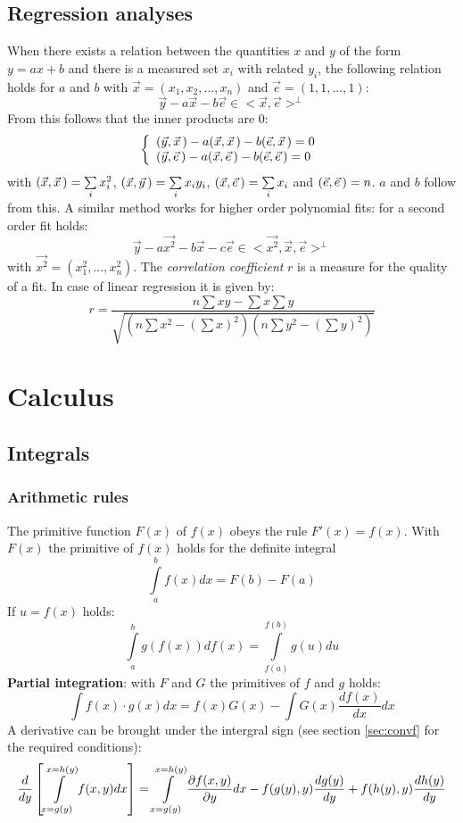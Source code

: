 \documentclass[twoside]{report}
\begin{document}
\section{Regression analyses}
When there exists a relation between the quantities $x$ and $y$ of the form
$y=ax+b$ and there is a measured set $x_i$ with related $y_i$, the following
relation holds for $a$ and $b$ with $\vec{x}=(x_1,x_2,...,x_n)$ and
$\vec{e}=(1,1,...,1)$:
\[
\vec{y}-a\vec{x}-b\vec{e}\in<\vec{x},\vec{e}>^\perp
\]
From this follows that the inner products are 0:
\[
\left\{
\begin{array}{l}
(\vec{y},\vec{x}\,)-a(\vec{x},\vec{x}\,)-b(\vec{e},\vec{x}\,)=0\\
(\vec{y},\vec{e}\,)-a(\vec{x},\vec{e}\,)-b(\vec{e},\vec{e}\,)=0
\end{array}\right.
\]
with $(\vec{x},\vec{x}\,)=\sum\limits_i x_i^2$, $(\vec{x},\vec{y}\,)=\sum\limits_ix_iy_i$,
$(\vec{x},\vec{e}\,)=\sum\limits_ix_i$ and $(\vec{e},\vec{e}\,)=n$.
$a$ and $b$ follow from this.
\npar
A similar method works for higher order polynomial fits: for a second order
fit holds:
\[
\vec{y}-a\vec{x^2}-b\vec{x}-c\vec{e}\in<\vec{x^2},\vec{x},\vec{e}>^\perp
\]
with $\vec{x^2}=(x_1^2,...,x_n^2)$.
\npar
The {\it correlation coefficient} $r$ is a measure for the quality of a fit.
In case of linear regression it is given by:
\[
r=\frac{n\sum xy-\sum x\sum y}{\sqrt{(n\sum x^2-(\sum x)^2)(n\sum y^2-(\sum y)^2)}}
\]


\chapter{Calculus}
\section{Integrals}
\subsection{Arithmetic rules}
The primitive function $F(x)$ of $f(x)$ obeys the rule $F'(x)=f(x)$. With
$F(x)$ the primitive of $f(x)$ holds for the definite integral
\[
\int\limits_a^bf(x)dx=F(b)-F(a)
\]
If $u=f(x)$ holds:
\[
\int\limits_a^bg(f(x))df(x)=\int\limits_{f(a)}^{f(b)}g(u)du
\]
{\bf Partial integration}: with $F$ and $G$ the primitives of $f$ and $g$
holds:
\[
\int f(x)\cdot g(x)dx=f(x)G(x)-\int G(x)\frac{df(x)}{dx}dx
\]
A derivative can be brought under the intergral sign (see section
\ref{sec:convf} for the required conditions):
\[
\frac{d}{dy}\left[\int\limits_{x=g(y)}^{x=h(y)}f(x,y)dx\right]=
\int\limits_{x=g(y)}^{x=h(y)}\frac{\partial f(x,y)}{\partial y}dx-f(g(y),y)\frac{dg(y)}{dy}+f(h(y),y)\frac{dh(y)}{dy}
\]
\end{document}
